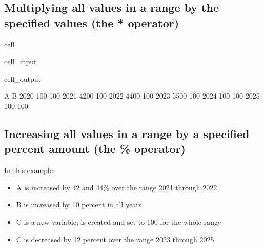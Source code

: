 \documentclass[letterpaper,10pt,english]{jupyterBook}
\begin{document}
\subsection{Multiplying all values in a range by the specified values (the * operator)}
\label{\detokenize{content/04_PythonEssentials/UpdateCommand:multiplying-all-values-in-a-range-by-the-specified-values-the-operator}}
\begin{sphinxuseclass}{cell}\begin{sphinxVerbatimInput}

\begin{sphinxuseclass}{cell_input}
\begin{sphinxVerbatim}[commandchars=\\\{\}]
\end{sphinxVerbatim}

\end{sphinxuseclass}\end{sphinxVerbatimInput}
\begin{sphinxVerbatimOutput}

\begin{sphinxuseclass}{cell_output}
\begin{sphinxVerbatim}[commandchars=\\\{\}]
         A    B
2020   100  100
2021  4200  100
2022  4400  100
2023  5500  100
2024   100  100
2025   100  100
\end{sphinxVerbatim}

\end{sphinxuseclass}\end{sphinxVerbatimOutput}

\end{sphinxuseclass}

\subsection{Increasing all  values in a range by a  specified percent amount (the \% operator)}
\label{\detokenize{content/04_PythonEssentials/UpdateCommand:increasing-all-values-in-a-range-by-a-specified-percent-amount-the-operator}}
\sphinxAtStartPar
In this example:
\begin{itemize}
\item {} 
\sphinxAtStartPar
A is increased by 42 and 44\% over the range 2021 through 2022.

\item {} 
\sphinxAtStartPar
B is increased by 10 percent in all years

\item {} 
\sphinxAtStartPar
C is a new variable, is created and set to 100 for the whole range

\item {} 
\sphinxAtStartPar
C is decreased by 12 percent over the range 2023 through 2025.

\end{itemize}
\end{document}
